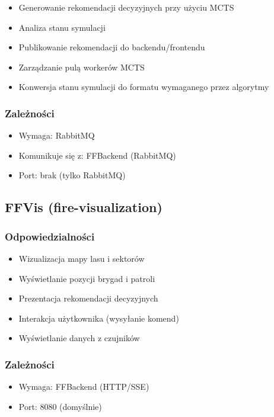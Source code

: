 \documentclass[11pt,a4paper]{article}
\begin{document}
\begin{itemize}
    \item Generowanie rekomendacji decyzyjnych przy użyciu MCTS
    \item Analiza stanu symulacji
    \item Publikowanie rekomendacji do backendu/frontendu
    \item Zarządzanie pulą workerów MCTS
    \item Konwersja stanu symulacji do formatu wymaganego przez algorytmy
\end{itemize}

\subsubsection{Zależności}

\begin{itemize}
    \item Wymaga: RabbitMQ
    \item Komunikuje się z: FFBackend (RabbitMQ)
    \item Port: brak (tylko RabbitMQ)
\end{itemize}

\subsection{FFVis (fire-visualization)}

\subsubsection{Odpowiedzialności}

\begin{itemize}
    \item Wizualizacja mapy lasu i sektorów
    \item Wyświetlanie pozycji brygad i patroli
    \item Prezentacja rekomendacji decyzyjnych
    \item Interakcja użytkownika (wysyłanie komend)
    \item Wyświetlanie danych z czujników
\end{itemize}

\subsubsection{Zależności}

\begin{itemize}
    \item Wymaga: FFBackend (HTTP/SSE)
    \item Port: 8080 (domyślnie)
\end{itemize}
\end{document}
